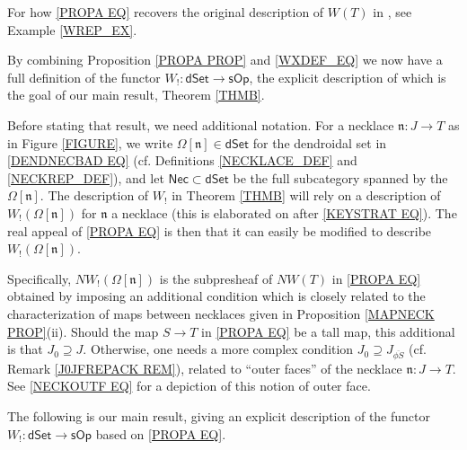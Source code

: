 \documentclass[a4paper,10pt]{article}%
\numberwithin{equation}{section}
\numberwithin{figure}{section}
\theoremstyle{definition} %
\newcommand{\sOp}{\mathsf{sOp}}
\newcommand{\dSet}{\mathsf{dSet}}
\begin{document}
For how \eqref{PROPA EQ}
recovers the original description of $W(T)$ in \cite[(4.1)]{CM13b},
see Example \ref{WREP_EX}.


\vskip 10pt


	By combining Proposition \ref{PROPA PROP} and \eqref{WXDEF_EQ}
	we now have a full definition of the functor
	$W_! \colon \mathsf{dSet} \to \sOp$,
	the explicit description of which is the goal of our main result, Theorem \ref{THMB}.

	
	Before stating that result, we need additional notation.
	For a necklace $\mathfrak{n}\colon J \to T$ as in Figure \ref{FIGURE},
	we write $\Omega[\mathfrak{n}] \in \dSet$
	for the dendroidal set in \eqref{DENDNECBAD EQ}
	(cf. Definitions \ref{NECKLACE_DEF} 
	and \ref{NECKREP_DEF}),
	and let $\mathsf{Nec} \subset \dSet$
	be the full subcategory spanned by the $\Omega[\mathfrak{n}]$. 
	The description of $W_!$ in Theorem \ref{THMB}
	will rely on a description 
	of $W_!(\Omega[\mathfrak{n}])$
	for $\mathfrak{n}$ a necklace 
	(this is elaborated on after \eqref{KEYSTRAT EQ}).
	The real appeal of \eqref{PROPA EQ}
	is then that it can easily be modified to describe
	$W_!(\Omega[\mathfrak{n}])$.
        
	Specifically,
	$N W_!(\Omega[\mathfrak{n}])$ is the subpresheaf of 
	$NW(T)$ in \eqref{PROPA EQ}
	obtained by imposing an additional condition
	which is closely related to the characterization of 
	maps between necklaces
	given in Proposition \ref{MAPNECK PROP}(ii).
	Should the map $S\to T$ in \eqref{PROPA EQ} be a tall map,
	this additional is that $J_0 \supseteq J$.
	Otherwise, one needs a more complex condition 
	$J_0 \supseteq J_{\overline{\phi S}}$
	(cf. Remark \ref{J0JFREPACK REM}),	
	related to 
	``outer faces'' of the necklace $\mathfrak{n}\colon J\to T$.
	See \eqref{NECKOUTF EQ} for a depiction of this notion
	of outer face.


The following is our main result, 
giving an explicit description of the
functor $W_!\colon \mathsf{dSet} \to \mathsf{sOp}$
based on \eqref{PROPA EQ}.
\end{document}
